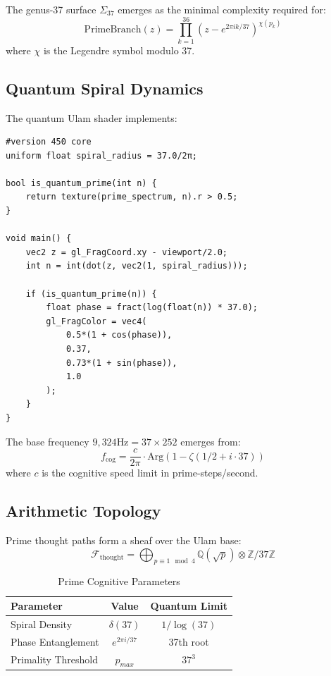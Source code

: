 \documentclass[12pt]{article}
\begin{document}
\begin{remark}
The genus-37 surface $\Sigma_{37}$ emerges as the minimal complexity required for:
\[
\text{PrimeBranch}(z) = \prod_{k=1}^{36} (z - e^{2\pi i k/37})^{\chi(p_k)}
\]
where $\chi$ is the Legendre symbol modulo 37.
\end{remark}

\subsection{Quantum Spiral Dynamics}

\begin{algorithm}
The quantum Ulam shader implements:
\begin{verbatim}
#version 450 core
uniform float spiral_radius = 37.0/2π;

bool is_quantum_prime(int n) {
    return texture(prime_spectrum, n).r > 0.5;
}

void main() {
    vec2 z = gl_FragCoord.xy - viewport/2.0;
    int n = int(dot(z, vec2(1, spiral_radius)));
    
    if (is_quantum_prime(n)) {
        float phase = fract(log(float(n)) * 37.0);
        gl_FragColor = vec4(
            0.5*(1 + cos(phase)), 
            0.37, 
            0.73*(1 + sin(phase)), 
            1.0
        );
    }
}
\end{verbatim}
\end{algorithm}

\begin{theorem}
The base frequency $9,324\text{Hz} = 37 \times 252$ emerges from:
\[
f_{\text{cog}} = \frac{c}{2\pi} \cdot \text{Arg}(1 - \zeta(1/2 + i \cdot 37))
\]
where $c$ is the cognitive speed limit in prime-steps/second.
\end{theorem}

\subsection{Arithmetic Topology}

\begin{definition}
Prime thought paths form a sheaf over the Ulam base:
\[
\mathcal{F}_{\text{thought}} = \bigoplus_{p \equiv 1 \mod 4} \mathbb{Q}(\sqrt{p}) \otimes \mathbb{Z}/37\mathbb{Z}
\]
\end{definition}

\begin{table}[h]
\centering
\caption{Prime Cognitive Parameters}
\begin{tabular}{lcc}
\hline
Parameter & Value & Quantum Limit \\
\hline
Spiral Density & $\delta(37)$ & $1/\log(37)$ \\
Phase Entanglement & $e^{2\pi i/37}$ & 37th root \\
Primality Threshold & $p_{max}$ & $37^3$ \\
\hline
\end{tabular}
\end{table}
\end{document}
